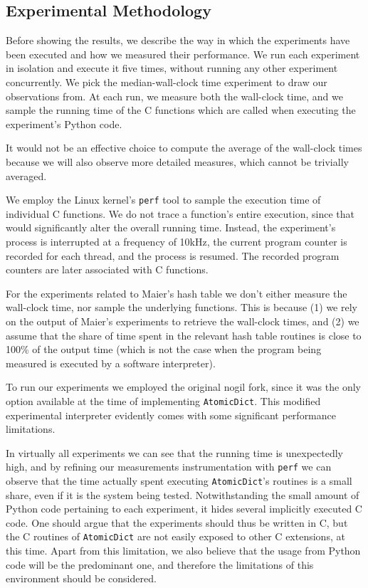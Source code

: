 \subsection{Experimental Methodology}\label{subsec:methodology}

Before showing the results, we describe the way in which the experiments have been executed and how we measured their performance.
We run each experiment in isolation and execute it five times, without running any other experiment concurrently.
We pick the median-wall-clock time experiment to draw our observations from.
At each run, we measure both the wall-clock time, and we sample the running time of the C functions which are called when executing the experiment's Python code.

It would not be an effective choice to compute the average of the wall-clock times because we will also observe more detailed measures, which cannot be trivially averaged.

We employ the Linux kernel's \texttt{perf} tool to sample the execution time of individual C functions.
We do not trace a function's entire execution, since that would significantly alter the overall running time.
Instead, the experiment's process is interrupted at a frequency of 10{kHz}, the current program counter is recorded for each thread, and the process is resumed.
The recorded program counters are later associated with C functions.

For the experiments related to Maier's hash table we don't either measure the wall-clock time, nor sample the underlying functions.
This is because (1) we rely on the output of Maier's experiments to retrieve the wall-clock times, and (2) we assume that the share of time spent in the relevant hash table routines is close to 100\% of the output time (which is not the case when the program being measured is executed by a software interpreter).

To run our experiments we employed the original nogil fork, since it was the only option available at the time of implementing \texttt{AtomicDict}.
This modified experimental interpreter evidently comes with some significant performance limitations.

In virtually all experiments we can see that the running time is unexpectedly high, and by refining our measurements instrumentation with \texttt{perf} we can observe that the time actually spent executing \texttt{AtomicDict}'s routines is a small share, even if it is the system being tested.
Notwithstanding the small amount of Python code pertaining to each experiment, it hides several implicitly executed C code.
One should argue that the experiments should thus be written in C, but the C routines of \texttt{AtomicDict} are not easily exposed to other C extensions, at this time.
Apart from this limitation, we also believe that the usage from Python code will be the predominant one, and therefore the limitations of this environment should be considered.

